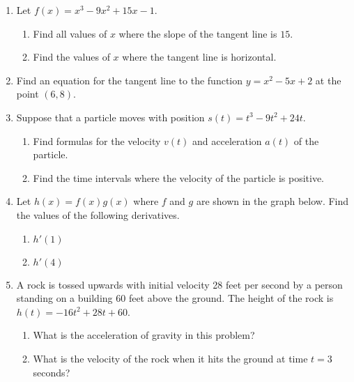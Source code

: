 \documentclass[11pt]{article}
\begin{document}
\begin{enumerate}
\setcounter{enumi}{\theenumCount}
\item Let $f(x) = x^{3} - 9 x^{2} + 15x - 1$. 
\begin{enumerate}
\item Find all values of $x$ where the slope of the tangent line is $15$. 
\vfill
\item Find the values of $x$ where the tangent line is horizontal. 
\vfill
\end{enumerate}

\item Find an equation for the tangent line to the function $y = x^2 - 5x + 2$ at the point $(6,8)$.
\vfill


\newpage
\item Suppose that a particle moves with position $s(t) = t^{3} - 9 t^{2} + 24 t$.
\begin{enumerate}
\item Find formulas for the velocity $v(t)$ and acceleration $a(t)$ of the particle. \vfill
\item Find the time intervals where the velocity of the particle is positive.
\end{enumerate}
\vfill

\item Let $h(x) = f(x) g(x)$ where $f$ and $g$ are shown in the graph below.  Find the values of the following derivatives.

\begin{center}
\end{center}
\begin{enumerate}
\item $h'(1)$ 
\bigskip
\item $h'(4)$ 
\bigskip
\end{enumerate}

\item A rock is tossed upwards with initial velocity 28 feet per second by a person standing on a building 60 feet above the ground.  The height of the rock is $h(t) = -16t^2 + 28t + 60$. 
\begin{enumerate}
\item What is the acceleration of gravity in this problem? 
\vfill

\item What is the velocity of the rock when it hits the ground at time $t = 3$ seconds?
\end{enumerate}
\vfill


\setcounter{enumCount}{\theenumi}
\end{enumerate}
\end{document}
